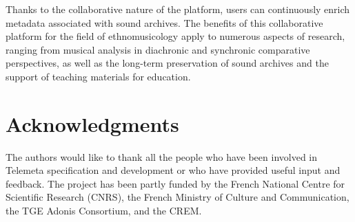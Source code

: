 \documentclass{sig-alternate}
\begin{document}
Thanks to the collaborative nature of the platform, users can continuously enrich metadata associated with sound archives. 
The benefits of this collaborative platform for the field of ethnomusicology apply to numerous aspects of research, ranging from musical analysis in diachronic and synchronic comparative perspectives, as well as the long-term preservation of sound archives and the support of teaching materials for education. 


\section{Acknowledgments}
The authors would like to thank all the people who have been involved in Telemeta specification and development or who have provided useful input and feedback. 
The project has been partly funded by the French National Centre for Scientific Research (CNRS), the French Ministry of Culture and Communication, the TGE Adonis Consortium, and the CREM.





\end{document}
